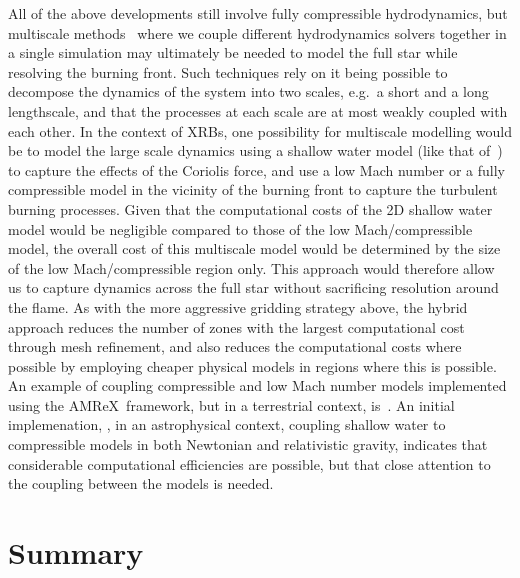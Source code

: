 \documentclass[a4paper]{jpconf}
\newcommand{\amrex}{{\sffamily AMReX}}
\newcommand{\MarginPar}[1]{\marginpar{\vskip-\baselineskip\raggedright\tiny\sffamily\hrule\smallskip{\color{red}#1}\par\smallskip\hrule}}
\begin{document}
All of the above developments still involve fully compressible
hydrodynamics, but multiscale methods~\cite{weinan2011principles} where we couple different hydrodynamics
solvers together in a single simulation may ultimately be needed to model the full star while resolving the burning front.
Such techniques rely on it being possible to decompose the dynamics of the system
into two scales, e.g.~a short and a long lengthscale, and that the processes at each
scale are at most weakly coupled with each other. In the context of XRBs, one possibility for
multiscale modelling would be to model the large scale dynamics using a shallow water model
(like that of~\cite{SPIT_ETAL02}) to capture the effects of the Coriolis force, and use
a low Mach number or
a fully compressible model in the vicinity of the burning front to capture
the turbulent burning processes. Given that the computational costs of the 2D shallow water model
would be negligible compared to those of the low Mach/compressible model, the overall cost of
this multiscale model would be determined by the size of the low Mach/compressible region only. This
approach would therefore allow us to capture dynamics across the full star
without sacrificing resolution around the flame.
As with the more aggressive gridding strategy above, the hybrid approach
reduces the number of zones with the largest computational cost through mesh
refinement, and also reduces the computational costs where possible by
employing cheaper physical models in regions where this is possible.
An example of coupling compressible and low Mach number models implemented using the \amrex~framework, but in a terrestrial context,
is~\cite{Motheau2018}. An initial implemenation, \cite{Harpole2018}, in an
astrophysical context, coupling shallow water to compressible models in both
Newtonian and relativistic gravity, indicates that considerable computational
efficiencies are possible, but that close attention to the coupling between the
models is needed.



\section{Summary}
\end{document}

